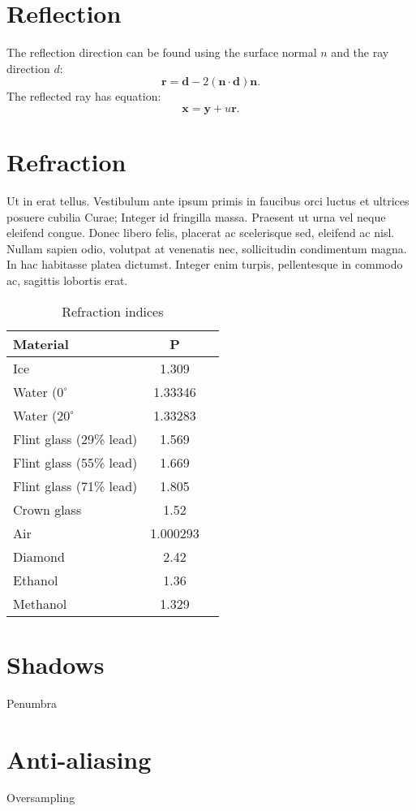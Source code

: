 \section{Reflection}
The reflection direction can be found using the surface normal $n$ and the ray direction $d$:\\
\[
\mathbf r = \mathbf d - 2(\mathbf n \cdot \mathbf d ) \mathbf n.
\]
The reflected ray has equation:
\[
\mathbf x = \mathbf y  + u \mathbf r.
\]
\section{Refraction}
Ut in erat tellus. Vestibulum ante ipsum primis in faucibus orci luctus et ultrices posuere cubilia Curae; Integer id fringilla massa. Praesent ut urna vel neque eleifend congue. Donec libero felis, placerat ac scelerisque sed, eleifend ac nisl. Nullam sapien odio, volutpat at venenatis nec, sollicitudin condimentum magna. In hac habitasse platea dictumst. Integer enim turpis, pellentesque in commodo ac, sagittis lobortis erat.
\\
\begin{table}
\begin{tabular}{| l | c | r |}
\hline
Material          			& P \\
\hline
Ice 						& 1.309 \\
Water ($0^{\circ}$			& 1.33346 \\
Water ($20^{\circ}$			& 1.33283 \\
Flint glass (29\% lead) 	& 1.569 \\
Flint glass (55\% lead) 	& 1.669 \\
Flint glass (71\% lead) 	& 1.805 \\
Crown glass					& 1.52 \\
Air 						& 1.000293 \\
Diamond 					& 2.42 \\
Ethanol 					& 1.36 \\
Methanol 					& 1.329 \\
\hline
\end{tabular}
\caption{Refraction indices}
\label{tab:Refraction indices}
\end{table}

\section{Shadows}
Penumbra
\section{Anti-aliasing}
Oversampling
